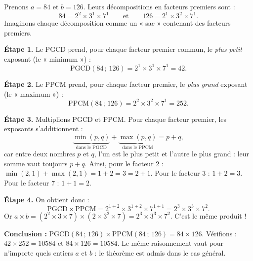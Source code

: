 \documentclass[11pt]{article}
\begin{document}
\begin{experience}
Prenons $a = 84$ et $b = 126$. Leurs décompositions en facteurs premiers sont :
\[ 84 = 2^2 \times 3^1 \times 7^1 \qquad\text{et}\qquad 126 = 2^1 \times 3^2 \times 7^1. \]
Imaginons chaque décomposition comme un « sac » contenant des facteurs premiers.

\textbf{Étape 1.} Le PGCD prend, pour chaque facteur premier commun, le \emph{plus petit} exposant (le « minimum ») :
\[ \mathrm{PGCD}(84\,;\,126) = 2^1 \times 3^1 \times 7^1 = 42. \]

\textbf{Étape 2.} Le PPCM prend, pour chaque facteur premier, le \emph{plus grand} exposant (le « maximum ») :
\[ \mathrm{PPCM}(84\,;\,126) = 2^2 \times 3^2 \times 7^1 = 252. \]

\textbf{Étape 3.} Multiplions PGCD et PPCM. Pour chaque facteur premier, les exposants s'additionnent :
\[ \underbrace{\min(p,q)}_{\text{dans le PGCD}} + \underbrace{\max(p,q)}_{\text{dans le PPCM}} = p + q, \]
car entre deux nombres $p$ et $q$, l'un est le plus petit et l'autre le plus grand : leur somme vaut toujours $p+q$. Ainsi, pour le facteur $2$ : $\min(2,1)+\max(2,1) = 1+2 = 3 = 2+1$. Pour le facteur $3$ : $1+2 = 3$. Pour le facteur $7$ : $1+1 = 2$.

\textbf{Étape 4.} On obtient donc :
\[ \mathrm{PGCD} \times \mathrm{PPCM} = 2^{1+2} \times 3^{1+2} \times 7^{1+1} = 2^3 \times 3^3 \times 7^2. \]
Or $a \times b = (2^2 \times 3 \times 7) \times (2 \times 3^2 \times 7) = 2^3 \times 3^3 \times 7^2$. C'est le même produit !

\textbf{Conclusion :} $\mathrm{PGCD}(84\,;\,126) \times \mathrm{PPCM}(84\,;\,126) = 84 \times 126$. Vérifions : $42 \times 252 = \num{10584}$ et $84 \times 126 = \num{10584}$. Le même raisonnement vaut pour n'importe quels entiers $a$ et $b$ : le théorème est admis dans le cas général.
\end{experience}
\end{document}
